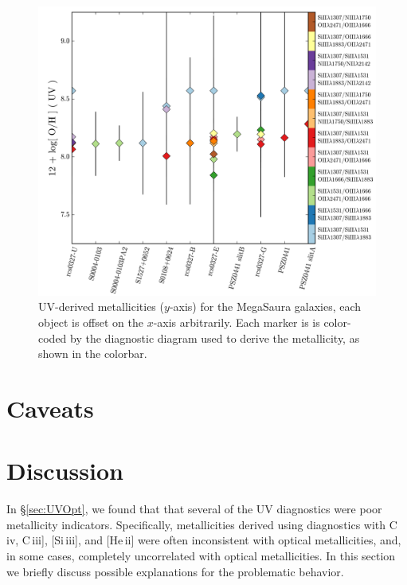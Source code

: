 \documentclass[preprint2]{aastex62}
\newcommand{\heii}{[He\,{\sc ii}]\xspace}
\newcommand{\civ}{C\,{\sc iv}\xspace}
\newcommand{\SiuIII}{[Si\,{\sc iii}]\xspace}
\newcommand{\ciii}{C\,{\sc iii}]\xspace}
\newcommand{\mage}{{\sc Meg}a{\sc S}a{\sc ura}\xspace}
\begin{document}
\begin{figure}
  \begin{center}
    \includegraphics[width=\linewidth]{figs/f8.png}
    \caption{UV-derived metallicities ($y$-axis) for the \mage galaxies, each object is offset on the $x$-axis arbitrarily. Each marker is is color-coded by the diagnostic diagram used to derive the metallicity, as shown in the colorbar. }
    \label{fig:UVmage}
  \end{center}
\end{figure}
\section{Caveats}\label{sec:caveats}

\section{Discussion}\label{sec:discussion}

In \S\ref{sec:UVOpt}, we found that that several of the UV diagnostics were poor metallicity indicators. Specifically, metallicities derived using diagnostics with \civ, \ciii, \SiuIII, and \heii were often inconsistent with optical metallicities, and, in some cases, completely uncorrelated with optical metallicities. In this section we briefly discuss possible explanations for the problematic behavior.
\end{document}
